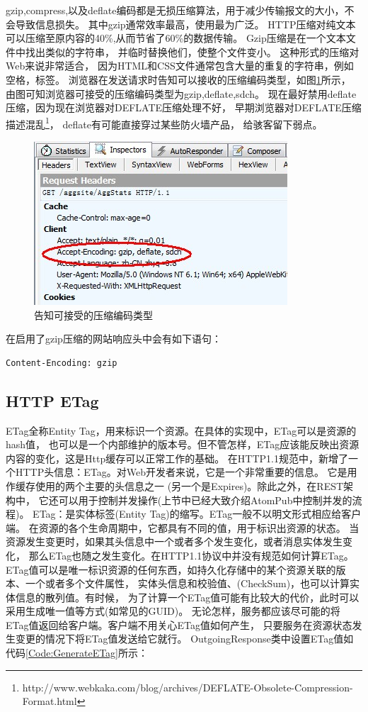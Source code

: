 \documentclass{book}
\begin{document}
gzip,compress,以及deflate编码都是无损压缩算法，用于减少传输报文的大小，不会导致信息损失。
其中gzip通常效率最高，使用最为广泛。 HTTP压缩对纯文本可以压缩至原内容的40\%,从而节省了60\%的数据传输。 
Gzip压缩是在一个文本文件中找出类似的字符串， 并临时替换他们，使整个文件变小。
这种形式的压缩对Web来说非常适合， 因为HTML和CSS文件通常包含大量的重复的字符串，例如空格，标签。
浏览器在发送请求时告知可以接收的压缩编码类型，如图\ref{fig:BrowserAcceptCodingType}所示，
由图可知浏览器可接受的压缩编码类型为gzip,deflate,sdch。
现在最好禁用deflate压缩，因为现在浏览器对DEFLATE压缩处理不好，
早期浏览器对DEFLATE压缩描述混乱\footnote{http://www.webkaka.com/blog/archives/DEFLATE-Obsolete-Compression-Format.html}，
deflate有可能直接穿过某些防火墙产品，
给骇客留下弱点。

\begin{figure}[htbp]
	\centering
	\includegraphics[scale=1]{HttpAcceptCompressEncoding.jpg}
	\caption{告知可接受的压缩编码类型}
	\label{fig:BrowserAcceptCodingType}
\end{figure}

在启用了gzip压缩的网站响应头中会有如下语句：

\begin{lstlisting}[language=HTML]
Content-Encoding: gzip
\end{lstlisting}

\subsection{HTTP ETag} 

ETag全称Entity Tag，用来标识一个资源。在具体的实现中，ETag可以是资源的hash值，
也可以是一个内部维护的版本号。但不管怎样，ETag应该能反映出资源内容的变化，这是Http缓存可以正常工作的基础。
在HTTP1.1规范中，新增了一个HTTP头信息：ETag。对Web开发者来说，它是一个非常重要的信息。
它是用作缓存使用的两个主要的头信息之一 (另一个是Expires)。除此之外，在REST架构中，
它还可以用于控制并发操作(上节中已经大致介绍AtomPub中控制并发的流程)。
ETag：是实体标签(Entity Tag)的缩写。ETag一般不以明文形式相应给客户端。
在资源的各个生命周期中，它都具有不同的值，用于标识出资源的状态。
当资源发生变更时，如果其头信息中一个或者多个发生变化，或者消息实体发生变化，
那么ETag也随之发生变化。在HTTP1.1协议中并没有规范如何计算ETag。
ETag值可以是唯一标识资源的任何东西，如持久化存储中的某个资源关联的版本、一个或者多个文件属性，
实体头信息和校验值、(CheckSum)，也可以计算实体信息的散列值。有时候，
为了计算一个ETag值可能有比较大的代价，此时可以采用生成唯一值等方式(如常见的GUID)。
无论怎样，服务都应该尽可能的将ETag值返回给客户端。客户端不用关心ETag值如何产生，
只要服务在资源状态发生变更的情况下将ETag值发送给它就行。
OutgoingResponse类中设置ETag值如代码\ref{Code:GenerateETag}所示：
\end{document}
